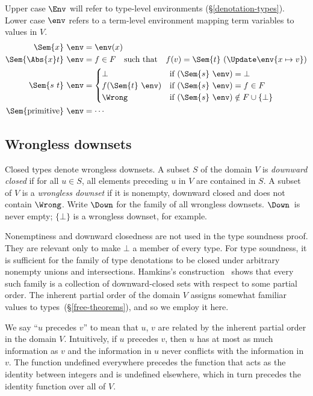 \documentclass{amsart}
\theoremstyle{definition}
\begin{document}
Upper case $\Env$ will refer to type-level environments
(\S\ref{denotation-types}). Lower case $\env$ refers to a
term-level environment mapping term variables to values in $V$.
\begin{align*}
\Sem{x}~\env&=\env(x)\\
\Sem{\Abs{x}t}~\env&=
  f\in F\text{\quad such that\quad}
  f(v)=\Sem{t}~(\Update\env{x\mapsto v})
\\
\Sem{s~t}~\env&=
\begin{cases}
\bot&\text{if }(\Sem{s}~\env)=\bot
\\
f(\Sem{t}~\env)&\text{if }(\Sem{s}~\env)=f\in F
\\
\Wrong&\text{if }(\Sem{s}~\env)\notin F\cup\{\bot\}
\end{cases}
\\
\Sem{\mathrm{primitive}}~\env&=\cdots
\end{align*}

\subsection{Wrongless downsets}
\label{wrongless}
Closed types denote wrongless downsets. A subset $S$ of the
domain $V$ is \emph{downward closed} if for all $u\in S$, all
elements preceding $u$ in $V$ are contained in $S$. A subset of
$V$ is a \emph{wrongless downset} if it is nonempty, downward
closed and does not contain $\Wrong$. Write $\Down$ for the
family of all wrongless downsets. $\Down$~is never empty;
$\{\bot\}$ is a wrongless downset, for example.

Nonemptiness and downward closedness are not used in the type
soundness proof. They are relevant only to make $\bot$ a member
of every type. For type soundness, it is sufficient for the
family of type denotations to be closed under arbitrary nonempty
unions and intersections. Hamkins's construction~\cite{Hamkins10}
shows that every such family is a collection of downward-closed
sets with respect to some partial order. The inherent partial
order of the domain $V$ assigns somewhat familiar values to
types~(\S\ref{free-theorems}), and so we employ it here.

We say ``$u$ precedes $v$'' to mean that $u$, $v$ are related by
the inherent partial order in the domain $V$. Intuitively, if $u$
precedes $v$, then $u$ has at most as much information as $v$ and
the information in $u$ never conflicts with the information in
$v$. The function undefined everywhere precedes the function that
acts as the identity between integers and is undefined elsewhere,
which in turn precedes the identity function over all of $V$.
\end{document}
